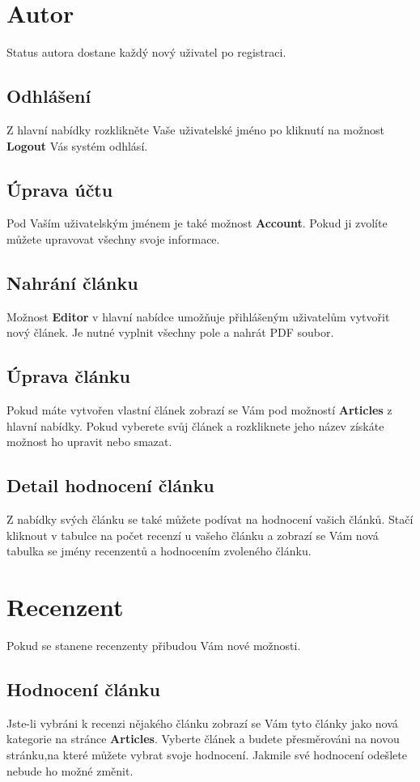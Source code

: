 \documentclass[czech,SP]{thesiskiv}
\begin{document}
\section{Autor}
Status autora dostane každý nový uživatel po registraci.
\subsection{Odhlášení}
Z hlavní nabídky rozklikněte Vaše uživatelské jméno po kliknutí na možnost \textbf{Logout} Vás systém odhlásí.
\subsection{Úprava účtu}
Pod Vaším uživatelským jménem je také možnost \textbf{Account}. Pokud ji zvolíte můžete upravovat všechny svoje informace.
\subsection{Nahrání článku}
Možnost \textbf{Editor} v hlavní nabídce umožňuje přihlášeným uživatelům vytvořit nový článek. Je nutné vyplnit všechny pole
a nahrát PDF soubor.
\subsection{Úprava článku}
Pokud máte vytvořen vlastní článek zobrazí se Vám pod možností \textbf{Articles} z hlavní nabídky. Pokud vyberete svůj článek a rozkliknete jeho název
získáte možnost ho upravit nebo smazat.
\subsection{Detail hodnocení článku}
Z nabídky svých článku se také můžete podívat na hodnocení vašich článků. Stačí kliknout v tabulce na počet recenzí u vašeho článku
a zobrazí se Vám nová tabulka se jmény recenzentů a hodnocením zvoleného článku.
\section{Recenzent}
Pokud se stanene recenzenty přibudou Vám nové možnosti.
\subsection{Hodnocení článku}
Jste-li vybráni k recenzi nějakého článku zobrazí se Vám tyto články jako nová kategorie na stránce \textbf{Articles}. 
Vyberte článek a budete přesměrováni na novou stránku,na které můžete vybrat svoje hodnocení. Jakmile své hodnocení odešlete nebude ho možné změnit.
\end{document}
